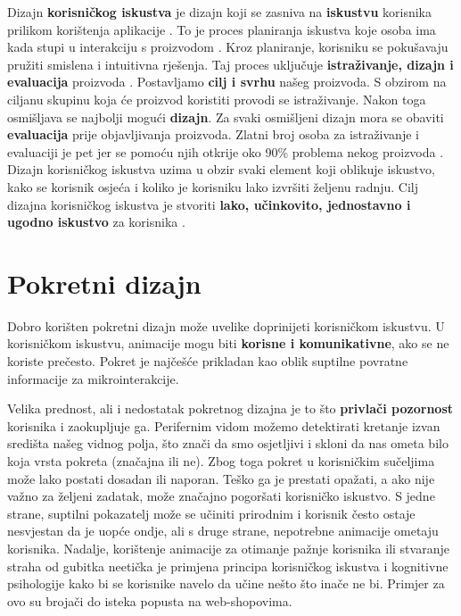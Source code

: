 \documentclass[times, utf8, zavrsni, numeric]{fer}
\begin{document}
    
    Dizajn \textbf{korisničkog iskustva} je dizajn koji se zasniva na \textbf{iskustvu} korisnika prilikom korištenja aplikacije \cite{pristup}. To je proces planiranja iskustva koje osoba ima kada stupi u interakciju s proizvodom \cite{uxui}. Kroz planiranje, korisniku se pokušavaju pružiti smislena i intuitivna rješenja. Taj proces uključuje \textbf{istraživanje, dizajn i evaluacija} proizvoda \cite{a11y}. Postavljamo \textbf{cilj i svrhu} našeg proizvoda. S obzirom na ciljanu skupinu koja će proizvod koristiti provodi se istraživanje. Nakon toga osmišljava se najbolji mogući \textbf{dizajn}. Za svaki osmišljeni dizajn mora se obaviti \textbf{evaluacija} prije objavljivanja proizvoda. Zlatni broj osoba za istraživanje i evaluaciji je pet jer se pomoću njih otkrije oko 90\% problema nekog proizvoda \cite{uxdesigner}. Dizajn korisničkog iskustva uzima u obzir svaki element koji oblikuje iskustvo, kako se korisnik osjeća i koliko je korisniku lako izvršiti željenu radnju. Cilj dizajna korisničkog iskustva je stvoriti \textbf{lako, učinkovito, jednostavno i ugodno iskustvo} za korisnika \cite{uivsux}.

    \section{Pokretni dizajn}
    Dobro korišten pokretni dizajn može uvelike doprinijeti korisničkom iskustvu. U korisničkom iskustvu, animacije mogu biti \textbf{korisne i komunikativne}, ako se ne koriste prečesto. Pokret je najčešće prikladan kao oblik suptilne povratne informacije za mikrointerakcije.
    
    Velika prednost, ali i nedostatak pokretnog dizajna je to što \textbf{privlači pozornost} korisnika i zaokupljuje ga. Perifernim vidom možemo detektirati kretanje izvan središta našeg vidnog polja, što znači da smo osjetljivi i skloni da nas ometa bilo koja vrsta pokreta (značajna ili ne). Zbog toga pokret u korisničkim sučeljima može lako postati dosadan ili naporan. Teško ga je prestati opažati, a ako nije važno za željeni zadatak, može značajno pogoršati korisničko iskustvo. S jedne strane, suptilni pokazatelj može se učiniti prirodnim i korisnik često ostaje nesvjestan da je uopće ondje, ali s druge strane, nepotrebne animacije ometaju korisnika. Nadalje, korištenje animacije za otimanje pažnje korisnika ili stvaranje straha od gubitka neetička je primjena principa korisničkog iskustva i kognitivne psihologije kako bi se korisnike navelo da učine nešto što inače ne bi. Primjer za ovo su brojači do isteka popusta na web-shopovima.
\end{document}
